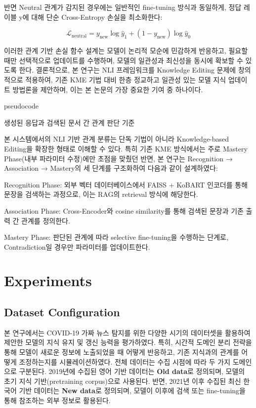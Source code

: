 \documentclass[a4paper,fleqn]{cas-sc}
\begin{document}
반면 Neutral 관계가 감지된 경우에는 일반적인 fine-tuning 방식과 동일하게, 정답 레이블 y에 대해 단순 Cross-Entropy 손실을 최소화한다:

\begin{equation}
    \mathcal{L}_{\text{neutral}} = {y_{\text{new}} \log \hat{y}_1 + (1 - y_{\text{new}}) \log \hat{y}_0}
\end{equation}

이러한 관계 기반 손실 함수 설계는 모델이 논리적 모순에 민감하게 반응하고, 필요할 때만 선택적으로 업데이트를 수행하며, 모델의 일관성과 최신성을 동시에 확보할 수 있도록 한다.
결론적으로, 본 연구는 NLI 프레임워크를 Knowledge Editing 문제에 창의적으로 적용하여, 기존 KME 기법 대비 한층 정교하고 일관성 있는 모델 지식 업데이트 방법론을 제안하며, 이는 본 논문의 가장 중요한 기여 중 하나이다.


pseudocode


생성된 응답과 검색된 문서 간 관계 판단 기준

본 시스템에서의 NLI 기반 관계 분류는 단독 기법이 아니라 Knowledge-based Editing을 확장한 형태로 이해할 수 있다. 특히 기존 KME 방식에서는 주로 Mastery Phase(내부 파라미터 수정)에만 초점을 맞췄던 반면, 본 연구는 Recognition → Association → Mastery의 세 단계를 구조화하여 다음과 같이 설계하였다:

Recognition Phase: 외부 벡터 데이터베이스에서 FAISS + KoBART 인코더를 통해 문장을 검색하는 과정으로, 이는 RAG의 retrieval 방식에 해당한다.

Association Phase: Cross-Encoder와 cosine similarity를 통해 검색된 문장과 기존 출력 간 관계를 정의한다.

Mastery Phase: 판단된 관계에 따라 selective fine-tuning을 수행하는 단계로, Contradiction일 경우만 파라미터를 업데이트한다.




\section{Experiments}

\subsection{Dataset Configuration}

본 연구에서는 COVID-19 가짜 뉴스 탐지를 위한 다양한 시기의 데이터셋을 활용하여 제안한 모델의 지식 유지 및 갱신 능력을 평가하였다.
특히, 시간적 도메인 분리 전략을 통해 모델이 새로운 정보에 노출되었을 때 어떻게 반응하고, 기존 지식과의 관계를 어떻게 조정하는지를 시뮬레이션하였다.
전체 데이터는 수집 시점에 따라 두 가지 도메인으로 구분된다.  
2019년에 수집된 영어 기반 데이터는 \textbf{Old data}로 정의되며, 모델의 초기 지식 기반(pretraining corpus)으로 사용된다.  
반면, 2021년 이후 수집된 최신 한국어 기반 데이터는 \textbf{New data}로 정의되며, 모델이 이후에 검색 또는 fine-tuning을 통해 참조하는 외부 정보로 활용된다.
\end{document}
